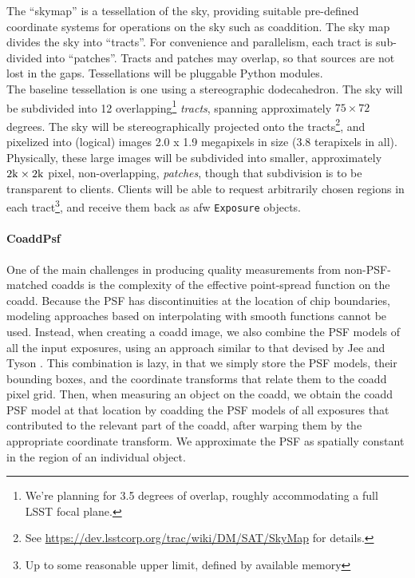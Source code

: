 \documentclass[12pt]{article}
\begin{document}
The ``skymap'' is a tessellation of the sky, providing suitable pre-defined coordinate systems for operations on the sky such as coaddition.  The sky map divides the sky into ``tracts''.  For convenience and parallelism, each tract is sub-divided into ``patches''.  Tracts and patches may overlap, so that sources are not lost in the gaps. Tessellations will be pluggable Python modules.
\\

The baseline tessellation is one using a stereographic dodecahedron. The sky will be subdivided into 12 overlapping\footnote{We're planning for 3.5 degrees of overlap, roughly accommodating a full LSST focal plane.} {\em tracts}, spanning approximately $75 \times 72$ degrees. The sky will be stereographically projected onto the tracts\footnote{See \url{https://dev.lsstcorp.org/trac/wiki/DM/SAT/SkyMap} for details.}, and pixelized into (logical) images 2.0 x 1.9 megapixels in size (3.8 terapixels in all). Physically, these large images will be subdivided into smaller, approximately $2{\rm k} \times 2{\rm k}$ pixel, non-overlapping, {\em patches}, though that subdivision is to be transparent to clients. Clients will be able to request arbitrarily chosen regions in each tract\footnote{Up to some reasonable upper limit, defined by available memory}, and receive them back as afw {\tt Exposure} objects.

\paragraph{CoaddPsf}
\label{alg:coaddPsf}

One of the main challenges in producing quality measurements from
non-PSF-matched coadds is the complexity of the effective point-spread
function on the coadd.  Because the PSF has discontinuities at the
location of chip boundaries, modeling approaches based on
interpolating with smooth functions cannot be used.  Instead, when
creating a coadd image, we also combine the PSF models of all the
input exposures, using an approach similar to that devised by
Jee and Tyson \cite{JeeTyson11}.  This combination is lazy, in that we simply store the
PSF models, their bounding boxes, and the coordinate transforms that
relate them to the coadd pixel grid.  Then, when measuring an object
on the coadd, we obtain the coadd PSF model at that location by coadding the
PSF models of all exposures that contributed to the relevant part of
the coadd, after warping them by the appropriate coordinate
transform.  We approximate the PSF as spatially constant in the region
of an individual object.
\end{document}
